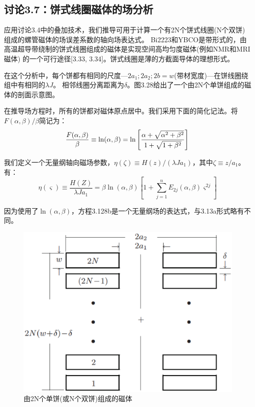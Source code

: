 \subsection{讨论3.7：饼式线圈磁体的场分析}
应用讨论3.4中的叠加技术，我们推导可用于计算一个有2N个饼式线圈(N个双饼)组成的螺管磁体的场误差系数的轴向场表达式。
Bi2223和YBCO是带形式的，由高温超导带绕制的饼式线圈组成的磁体是实现空间高均匀度磁体(例如NMR和MRI磁体)
的一个可行途径[3.33, 3.34]。饼式线圈是薄的方截面导体的理想形式。

在这个分析中，每个饼都有相同的尺度---$2a_1;2a_2;2b=w$(带材宽度)---在饼线圈绕组中有相同的$\lambda J$。
相邻线圈分离距离为$\delta$。图3.28给出了一个由2N个单饼组成的磁体的剖面示意图。

在推导场方程时，所有的饼都对磁体原点居中。我们采用下面的简化记法。将$F(\alpha,\beta)/{\beta}$简记为：
\begin{equation}
\frac{F(\alpha,\beta)}{\beta}\equiv \ln(\alpha,\beta)=\ln\left[\frac{\alpha+\sqrt{\alpha^2+\beta^2}}{1+\sqrt{1+\beta^2}}\right]\\%
\end{equation}

我们定义一个无量纲轴向磁场参数，$\eta(\zeta)\equiv H(z)/(\lambda J a_1)$，其中$\zeta\equiv z/a_1$。有：
\begin{equation*}
\eta(\varsigma)\equiv \frac{H(Z)}{\lambda Ja_{1}}=\beta \ln(\alpha,\beta)\left[1+\sum_{j=1}^{n} E_{2j}(\alpha,\beta)\varsigma^{2j}\right]\tag{3.128b}
\end{equation*}

因为使用了$\ln(\alpha,\beta)$，方程3.128b是一个无量纲场的表达式，与3.13a形式略有不同。
\begin{figure}[htbp]
	\centering
	\includegraphics[scale=0.4]{chpt3/figs/fig3.28.eps}
	\caption{由2N个单饼(或N个双饼)组成的磁体}
\end{figure}

